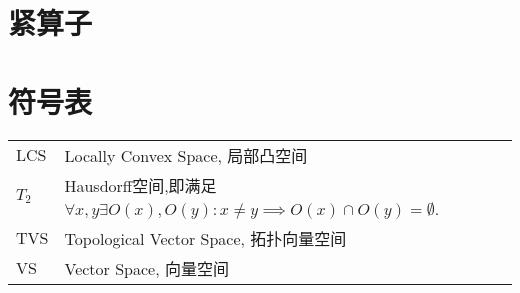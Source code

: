 \documentclass{article}
\begin{document}
\section{紧算子}

\section{符号表}
\begin{tabular}{ll}
    LCS&Locally Convex Space, 局部凸空间\\
    $T_2$&Hausdorff空间,即满足$\forall x,y\exists O(x),O(y):x\neq y\implies O(x)\cap O(y)=\emptyset$.\\
    TVS&Topological Vector Space, 拓扑向量空间\\
    VS&Vector Space, 向量空间
\end{tabular}
\end{document}
